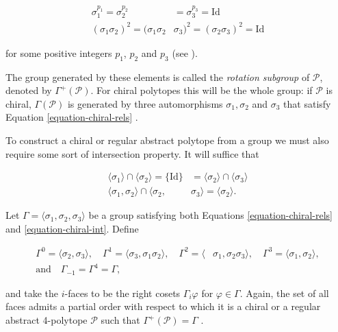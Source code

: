 \documentclass{amsart}
\begin{document}
\begin{equation}
\label{equation-chiral-rels}
\begin{aligned}
\sigma_1^{p_1}=\sigma_2^{p_2}&=\sigma_3^{p_3}=\text{Id}\\
(\sigma_1\sigma_2)^2=(\sigma_1\sigma_2&\sigma_3)^2=(\sigma_2\sigma_3)^2=\text{Id}
\end{aligned}
\end{equation}

for some positive integers $p_1$, $p_2$ and $p_3$ (see \cite{egon-asia-chiral}).
	
The group generated by these elements is called the \textit{rotation subgroup}
of $\mathcal{P}$, denoted by $\Gamma^+(\mathcal{P})$. For chiral polytopes this
will be the whole group: if $\mathcal{P}$ is chiral, $\Gamma(\mathcal{P})$ is
generated by three automorphisms $\sigma_1,\sigma_2$ and $\sigma_3$ that satisfy
Equation \ref{equation-chiral-rels} \cite[Proposition 3]{egon-asia-chiral}.
	
To construct a chiral or regular abstract polytope from a group we must
also require some sort of intersection property. It will suffice that

\begin{equation}
\label{equation-chiral-int}
\begin{aligned}
\langle\sigma_1\rangle\cap\langle\sigma_2\rangle=\{\text{Id}\}
&=\langle\sigma_2\rangle\cap\langle\sigma_3\rangle\\
\langle\sigma_1,\sigma_2\rangle\cap\langle\sigma_2,&\sigma_3\rangle
=\langle\sigma_2\rangle.
\end{aligned}
\end{equation}

Let $\Gamma=\langle \sigma_1,\sigma_2,\sigma_3\rangle$ be a group satisfying
both Equations \ref{equation-chiral-rels} and \ref{equation-chiral-int}. Define

\begin{align*}
\Gamma^0=\langle\sigma_2,\sigma_3\rangle,\quad
\Gamma^1=\langle \sigma_3,\sigma_1\sigma_2\rangle,\quad
\Gamma^2=\langle &\sigma_1,\sigma_2\sigma_3\rangle,\quad
\Gamma^3=\langle \sigma_1,\sigma_2\rangle,\\
\text{and}\quad\Gamma_{-1}=\Gamma^4=\Gamma,
\end{align*}

and take the $i$-faces to be the right cosets $\Gamma_i\varphi$ for
$\varphi\in\Gamma$. Again, the set of all faces admits a partial order with
respect to which it is a chiral or a regular abstract 4-polytope $\mathcal{P}$
such that $\Gamma^+(\mathcal{P})=\Gamma$ \cite[Theorem 1, Lemma
11]{egon-asia-chiral}.
	
\end{document}
